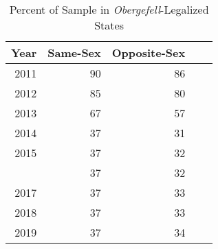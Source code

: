 \begin{table}[htbp]

\caption{Percent of Sample in \textit{Obergefell}-Legalized States}
\label{tab: prop_newlegal} %
\centering
\begin{tabular}[t]{rrrrr}
\toprule
\cmidrule(l{3pt}r{3pt}){2-3} \cmidrule(l{3pt}r{3pt}){4-5}
Year & Same-Sex & Opposite-Sex\\
\midrule
2011 & 90 & 86\\
2012 & 85 & 80\\
2013 & 67 & 57\\
2014 & 37 & 31\\
2015 & 37 & 32\\
\addlinespace
2016 & 37 & 32\\
2017 & 37 & 33\\
2018 & 37 & 33\\
2019 & 37 & 34\\
\bottomrule
\end{tabular}
\end{table}
